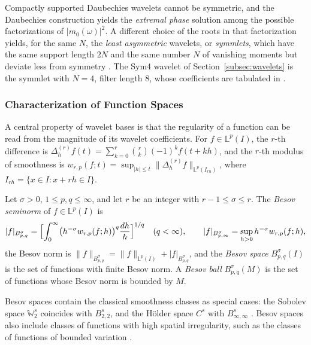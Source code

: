 Compactly supported Daubechies wavelets cannot be symmetric, and the
Daubechies construction yields the \emph{extremal
phase} solution among the possible factorizations of $|m_0(\omega)|^2$. A
different choice of the roots in that factorization yields, for the same
$N$, the \emph{least asymmetric} wavelets, or \emph{symmlets}, which have the
same support length $2N$ and the same number $N$ of vanishing moments but
deviate less from symmetry \cite[Sec.~3.5.2]{vidakovic1999}. The Sym4
wavelet of Section~\ref{subsec:wavelets} is the symmlet with $N = 4$, filter
length 8, whose coefficients are tabulated in
\cite[Table~3.4]{vidakovic1999}.

\subsubsection{Characterization of Function Spaces}
\label{subsubsec:besov}

A central property of wavelet bases is that the regularity of a function
can be read from the magnitude of its wavelet coefficients. For
$f\in\mathbb{L}^p(I)$, the $r$-th difference is
$\Delta_h^{(r)}f(t) = \sum_{k=0}^r\binom{r}{k}(-1)^kf(t+kh)$, and the
$r$-th modulus of smoothness is $w_{r,p}(f;t) = \sup_{|h|\leq t}
\|\Delta_h^{(r)}f\|_{\mathbb{L}^p(I_{rh})}$, where
$I_{rh} = \{x\in I : x+rh\in I\}$.

\begin{definition}
\label{def:besov}
Let $\sigma>0$, $1\leq p,q\leq\infty$, and let $r$ be an integer with
$r-1\leq\sigma\leq r$. The \emph{Besov seminorm} of $f\in\mathbb{L}^p(I)$ is
\begin{equation*}
|f|_{B^\sigma_{p,q}} = \Bigl[\int_0^\infty\bigl(h^{-\sigma}w_{r,p}(f;h)\bigr)^q
\frac{dh}{h}\Bigr]^{1/q}\quad(q<\infty),\qquad
|f|_{B^\sigma_{p,\infty}} = \sup_{h>0}h^{-\sigma}w_{r,p}(f;h),
\end{equation*}
the Besov norm is $\|f\|_{B^\sigma_{p,q}} = \|f\|_{\mathbb{L}^p(I)} +
|f|_{B^\sigma_{p,q}}$, and the \emph{Besov space} $B^\sigma_{p,q}(I)$ is the
set of functions with finite Besov norm. A \emph{Besov ball}
$B^\sigma_{p,q}(M)$ is the set of functions whose Besov norm is bounded by
$M$.
\end{definition}

Besov spaces contain the
classical smoothness classes as special cases: the Sobolev space
$\mathbb{W}^s_2$ coincides with $B^s_{2,2}$, and the H\"older space
$C^s$ with $B^s_{\infty,\infty}$ \cite[Ex.~2.5.1]{vidakovic1999}. Besov
spaces also include classes of functions with high spatial irregularity,
such as the classes of functions of bounded variation
\cite[Ex.~2.5.2]{vidakovic1999}.

